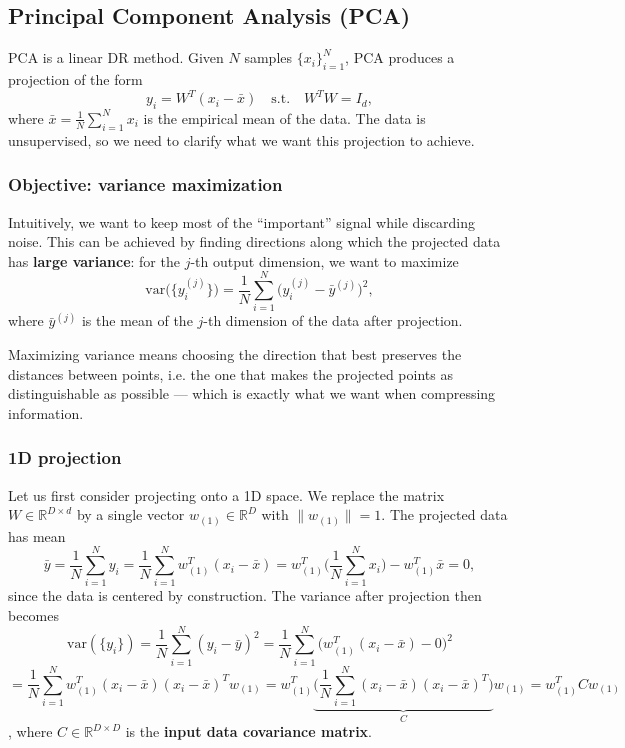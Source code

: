 \subsection{Principal Component Analysis (PCA)}
PCA is a linear DR method. Given $N$ samples
$\{x_i\}_{i=1}^{N}$, PCA produces a projection of the form
\[
y_i = W^T (x_i - \bar{x}) \quad \text{s.t.} \quad W^T W = I_d,
\]
where $\bar{x} = \tfrac{1}{N} \sum_{i=1}^{N} x_i$ is the empirical mean of the data.
The data is unsupervised, so we need to clarify what we want this projection to
achieve.

\subsubsection{Objective: variance maximization}
Intuitively, we want to keep most of the ``important'' signal while discarding noise. This can
be achieved by finding directions along which the projected data has \textbf{large variance}:
for the $j$-th output dimension, we want to maximize
\[
\mathrm{var}\bigl(\{y_i^{(j)}\}\bigr) = \frac{1}{N} \sum_{i=1}^{N} \bigl(y_i^{(j)} - \bar{y}^{(j)}\bigr)^2,
\]
where $\bar{y}^{(j)}$ is the mean of the $j$-th dimension of the data after projection.

Maximizing variance means choosing the direction that best preserves the distances between points, 
i.e. the one that makes the projected points as distinguishable as possible — 
which is exactly what we want when compressing information.

\subsubsection{1D projection}
Let us first consider projecting onto a 1D space. We replace the matrix $W \in \mathbb{R}^{D \times d}$
by a single vector $w_{(1)} \in \mathbb{R}^D$ with $\|w_{(1)}\| = 1$. The projected data has mean
\[
\bar{y} = \frac{1}{N} \sum_{i=1}^{N} y_i 
        = \frac{1}{N} \sum_{i=1}^{N} w_{(1)}^T (x_i - \bar{x})
        = w_{(1)}^T \biggl( \frac{1}{N} \sum_{i=1}^{N} x_i \biggr) - w_{(1)}^T \bar{x} = 0,
\]
since the data is centered by construction. The variance after projection then becomes
\[
\mathrm{var}(\{y_i\}) = \frac{1}{N} \sum_{i=1}^{N} (y_i - \bar{y})^2
=\frac{1}{N} \sum_{i=1}^{N} \bigl(w_{(1)}^T (x_i - \bar{x})\bigr - 0)^2 
  \]
  \[
    = \frac{1}{N} \sum_{i=1}^{N}w_{(1)}^T (x_i - \bar{x})(x_i - \bar{x})^T w_{(1)}
= w_{(1)}^T \underbrace{\biggl( \frac{1}{N} \sum_{i=1}^{N} (x_i - \bar{x})(x_i - \bar{x})^T \biggr)}_{C} w_{(1)}
= w_{(1)}^T C w_{(1)}
\], where $C \in \mathbb{R}^{D \times D}$ is the \textbf{input data covariance matrix}.

